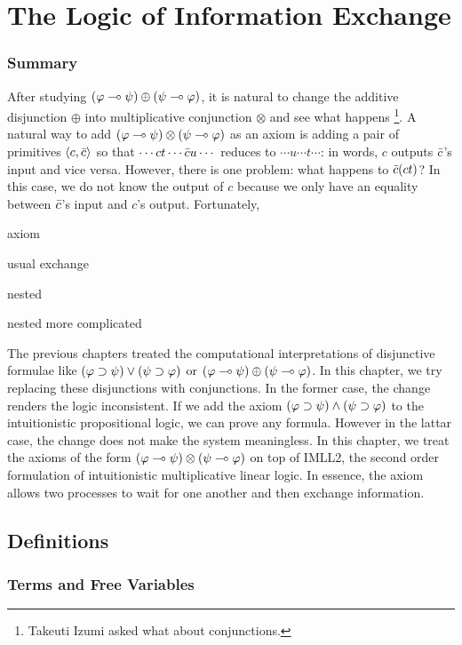\chapter{The Logic of Information Exchange}
\label{ch:exchange}

\subsection{Summary}

After studying $(\varphi\multimap\psi)\oplus (\psi\multimap\varphi)$,
it is natural to change the additive disjunction $\oplus$ into
multiplicative conjunction $\otimes$ and see what happens%
\footnote{Takeuti Izumi asked what about conjunctions.}.
A natural way to add $(\varphi\multimap\psi)\otimes(\psi\multimap\varphi)$ as an axiom
is adding a pair of primitives $\langle{c,\bar{c}}\rangle$ so that
$\cdots ct \cdots \bar{c} u \cdots$ reduces to
$\cdots u  \cdots t \cdots$: in words,
$c$ outputs $\bar{c}$'s input and vice versa.
However, there is one problem: what happens to $\bar{c}(c t)$?
In this case, we do not know the output of $c$ because we only have an
equality between $\bar{c}$'s input and $c$'s output.
Fortunately, 



axiom

usual exchange

nested

nested more complicated

The previous chapters treated the computational interpretations of
disjunctive formulae like $(\varphi\supset\psi)\lor(\psi\supset\varphi)$ or
$(\varphi\multimap\psi)\oplus(\psi\multimap\varphi)$.  In this chapter, we try
replacing these disjunctions with conjunctions.
In the former case, the change renders the logic inconsistent.
If we add the axiom $(\varphi\supset\psi)\land(\psi\supset\varphi)$ to the
intuitionistic propositional logic,
we can prove any formula.  However in the lattar case, the change does
not make the system meaningless.
In this chapter, we treat
the axioms of the form $(\varphi\multimap\psi)\otimes(\psi\multimap\varphi)$
on top of IMLL2, the second order formulation of intuitionistic
multiplicative linear
logic.  In essence, the axiom allows two processes to wait for one
another and then exchange information.

\section{Definitions}

\subsection{Terms and Free Variables}

